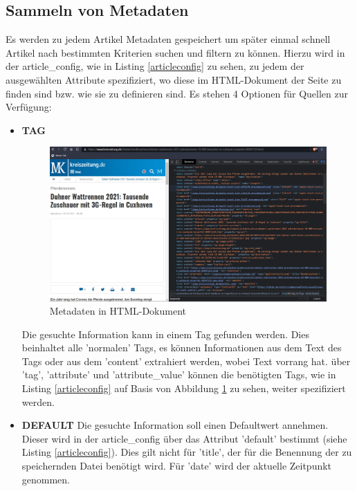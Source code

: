 \documentclass[12pt,oneside,a4paper,parskip]{scrbook}
\begin{document}
\subsection{Sammeln von Metadaten}
Es werden zu jedem Artikel Metadaten gespeichert um später einmal schnell Artikel nach bestimmten Kriterien suchen und filtern zu können. Hierzu wird in der article\_config, wie in Listing \ref{articleconfig} zu sehen, zu jedem der ausgewählten Attribute spezifiziert, wo diese im HTML-Dokument der Seite zu finden sind bzw. wie sie zu definieren sind. Es stehen 4 Optionen für Quellen zur Verfügung:
\begin{itemize}
\item \textbf{TAG} \newline
\begin{figure}[h!]
\caption{Metadaten in HTML-Dokument}
\label{articlemeta}
\centering
\includegraphics[scale=0.4]{articles_meta.png}
\end{figure} \newline
Die gesuchte Information kann in einem Tag gefunden werden. Dies beinhaltet alle 'normalen' Tags, es können Informationen aus dem Text des Tags oder aus dem 'content' extrahiert werden, wobei Text vorrang hat. über 'tag', 'attribute' und 'attribute\_value' können die benötigten Tags, wie in Listing \ref{articleconfig} auf Basis von Abbildung \ref{articlemeta} zu sehen, weiter spezifiziert werden.


\item \textbf{DEFAULT} \newline
Die gesuchte Information soll einen Defaultwert annehmen. Dieser wird in der article\_config über das Attribut 'default' bestimmt (siehe Listing \ref{articleconfig}). Dies gilt nicht für 'title', der für die Benennung der zu speichernden Datei benötigt wird. Für 'date' wird der aktuelle Zeitpunkt genommen.


\end{itemize}
\end{document}
